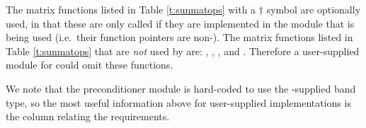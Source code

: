 The matrix functions listed in Table \ref{t:sunmatops} with
a $\dagger$ symbol are optionally used, in that these are only called
if they are implemented in the {\sunmatrix} module that is being used
(i.e.~their function pointers are non-).  The matrix
functions listed in Table \ref{t:sunmatops} that are {\em not} used by 
{\kinsol} are: , , ,
 and . Therefore a user-supplied
{\sunmatrix} module for {\kinsol} could omit these functions.

We note that the {\kinbbdpre} preconditioner module is hard-coded to
use the {\sundials}-supplied band {\sunmatrix} type, so the most
useful information above for user-supplied {\sunmatrix}
implementations is the column relating the {\kinls} requirements. 





